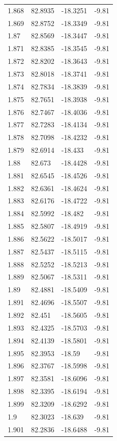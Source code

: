 \begin{tabular}{llll}
1.868 & 82.8935 & -18.3251 & -9.81 \\
1.869 & 82.8752 & -18.3349 & -9.81 \\
1.87 & 82.8569 & -18.3447 & -9.81 \\
1.871 & 82.8385 & -18.3545 & -9.81 \\
1.872 & 82.8202 & -18.3643 & -9.81 \\
1.873 & 82.8018 & -18.3741 & -9.81 \\
1.874 & 82.7834 & -18.3839 & -9.81 \\
1.875 & 82.7651 & -18.3938 & -9.81 \\
1.876 & 82.7467 & -18.4036 & -9.81 \\
1.877 & 82.7283 & -18.4134 & -9.81 \\
1.878 & 82.7098 & -18.4232 & -9.81 \\
1.879 & 82.6914 & -18.433 & -9.81 \\
1.88 & 82.673 & -18.4428 & -9.81 \\
1.881 & 82.6545 & -18.4526 & -9.81 \\
1.882 & 82.6361 & -18.4624 & -9.81 \\
1.883 & 82.6176 & -18.4722 & -9.81 \\
1.884 & 82.5992 & -18.482 & -9.81 \\
1.885 & 82.5807 & -18.4919 & -9.81 \\
1.886 & 82.5622 & -18.5017 & -9.81 \\
1.887 & 82.5437 & -18.5115 & -9.81 \\
1.888 & 82.5252 & -18.5213 & -9.81 \\
1.889 & 82.5067 & -18.5311 & -9.81 \\
1.89 & 82.4881 & -18.5409 & -9.81 \\
1.891 & 82.4696 & -18.5507 & -9.81 \\
1.892 & 82.451 & -18.5605 & -9.81 \\
1.893 & 82.4325 & -18.5703 & -9.81 \\
1.894 & 82.4139 & -18.5801 & -9.81 \\
1.895 & 82.3953 & -18.59 & -9.81 \\
1.896 & 82.3767 & -18.5998 & -9.81 \\
1.897 & 82.3581 & -18.6096 & -9.81 \\
1.898 & 82.3395 & -18.6194 & -9.81 \\
1.899 & 82.3209 & -18.6292 & -9.81 \\
1.9 & 82.3023 & -18.639 & -9.81 \\
1.901 & 82.2836 & -18.6488 & -9.81 \\

\end{tabular}
